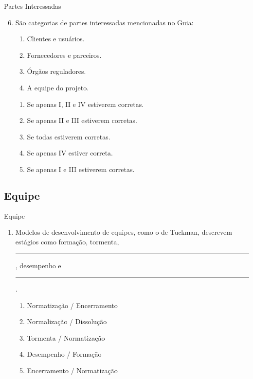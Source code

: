 \documentclass{beamer}
\begin{document}
\begin{frame}{Partes Interessadas}
	\begin{enumerate}
		\setcounter{enumi}{5}
		\justifying
		\item São categorias de partes interessadas mencionadas no Guia:
		\begin{enumerate}[I]
			\item Clientes e usuários.
			\item Fornecedores e parceiros.
			\item Órgãos reguladores.
			\item A equipe do projeto.
		\end{enumerate}
		\begin{enumerate}[a]
			\item Se apenas I, II e IV estiverem corretas.
			\item Se apenas II e III estiverem corretas.
			\item \alert<2>{Se todas estiverem corretas.}
			\item Se apenas IV estiver correta.
			\item Se apenas I e III estiverem corretas.
		\end{enumerate}
	\end{enumerate}
\end{frame}

\subsection{Equipe}

\begin{frame}{Equipe}
	\begin{enumerate}
		\justifying
		\item Modelos de desenvolvimento de equipes, como o de Tuckman, descrevem estágios como formação, tormenta, \rule{50pt}{1pt}, desempenho e \rule{50pt}{1pt}.
		\begin{enumerate}[a]
			\item Normatização / Encerramento
			\item \alert<2>{Normalização / Dissolução}
			\item Tormenta / Normatização
			\item Desempenho / Formação
			\item Encerramento / Normatização
		\end{enumerate}
	\end{enumerate}
\end{frame}
\end{document}
